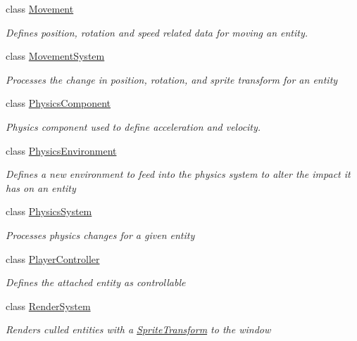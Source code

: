 \begin{DoxyCompactItemize}
class \hyperlink{class_midnight_blue_1_1_engine_1_1_entity_component_1_1_movement}{Movement}
\begin{DoxyCompactList}\small\item\em Defines position, rotation and speed related data for moving an entity. \end{DoxyCompactList}\item 
class \hyperlink{class_midnight_blue_1_1_engine_1_1_entity_component_1_1_movement_system}{Movement\+System}
\begin{DoxyCompactList}\small\item\em Processes the change in position, rotation, and sprite transform for an entity \end{DoxyCompactList}\item 
class \hyperlink{class_midnight_blue_1_1_engine_1_1_entity_component_1_1_physics_component}{Physics\+Component}
\begin{DoxyCompactList}\small\item\em Physics component used to define acceleration and velocity. \end{DoxyCompactList}\item 
class \hyperlink{class_midnight_blue_1_1_engine_1_1_entity_component_1_1_physics_environment}{Physics\+Environment}
\begin{DoxyCompactList}\small\item\em Defines a new environment to feed into the physics system to alter the impact it has on an entity \end{DoxyCompactList}\item 
class \hyperlink{class_midnight_blue_1_1_engine_1_1_entity_component_1_1_physics_system}{Physics\+System}
\begin{DoxyCompactList}\small\item\em Processes physics changes for a given entity \end{DoxyCompactList}\item 
class \hyperlink{class_midnight_blue_1_1_engine_1_1_entity_component_1_1_player_controller}{Player\+Controller}
\begin{DoxyCompactList}\small\item\em Defines the attached entity as controllable \end{DoxyCompactList}\item 
class \hyperlink{class_midnight_blue_1_1_engine_1_1_entity_component_1_1_render_system}{Render\+System}
\begin{DoxyCompactList}\small\item\em Renders culled entities with a \hyperlink{class_midnight_blue_1_1_engine_1_1_entity_component_1_1_sprite_transform}{Sprite\+Transform} to the window \end{DoxyCompactList}\item 

\end{DoxyCompactItemize}
